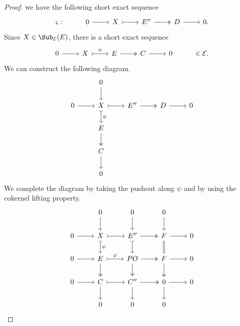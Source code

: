 \begin{proof}
we have the following short exact sequence
 \[\begin{tikzcd}
	\varsigma: & 0 & X & E'' & D&  0.
	\arrow[from=1-2, to=1-3]
	\arrow[tail, from=1-3, to=1-4]
	\arrow[two heads,from=1-4, to=1-5]
	\arrow[from=1-5, to=1-6]
\end{tikzcd}\] Since $X \in \Sub_\mathcal{E}(E)$,
there is a short exact sequence \[\begin{tikzcd}
	0 & X & E  & C &  0& \in \mathcal{E}.
	\arrow[from=1-1, to=1-2]
	\arrow[tail,"\psi", from=1-2, to=1-3]
	\arrow[,two heads,from=1-3, to=1-4]
	\arrow[from=1-4, to=1-5]
\end{tikzcd} \]
We can construct the following diagram.
\[\begin{tikzcd}
         & 0 & & &  \\
	0 & X & E''  & D &  0 \\
      & E & &  & \\
      & C & & & \\
       & 0 & & & 
	\arrow[from=2-1, to=2-2]
	\arrow[tail, from=2-2, to=2-3]
	\arrow[two heads,from=2-3, to=2-4]
	\arrow[from=2-4, to=2-5]
        \arrow[from=4-2, to=5-2]
	\arrow[two heads, from=3-2, to=4-2]
	\arrow[tail,"\psi",from=2-2, to=3-2]
	\arrow[from=1-2, to=2-2]
\end{tikzcd} \]
We complete the diagram by taking the pushout along $\psi$ and by using the cokernel lifting property. 
\[\begin{tikzcd}
         & 0 & 0 & 0 &  \\
	0 & X & E''  & F &  0 \\
     0 & E & PO & F & 0 \\
      0 & C & C'' & 0 & 0 \\
       & 0 & 0 & 0 & 
	\arrow[from=2-1, to=2-2]
	\arrow[tail, from=2-2, to=2-3]
	\arrow[two heads,from=2-3, to=2-4]
	\arrow[from=2-4, to=2-5]
        \arrow[from=3-1, to=3-2]
	\arrow[tail,"\varphi", from=3-2, to=3-3]
	\arrow[two heads,from=3-3, to=3-4]
	\arrow[from=3-4, to=3-5]
        \arrow[from=4-1, to=4-2]
	\arrow[tail, from=4-2, to=4-3]
	\arrow[two heads,from=4-3, to=4-4]
	\arrow[from=4-4, to=4-5]
        \arrow[from=4-2, to=5-2]
	\arrow[two heads, from=3-2, to=4-2]
	\arrow[tail,"\psi",from=2-2, to=3-2]
	\arrow[from=1-2, to=2-2]
        \arrow[from=4-3, to=5-3]
	\arrow[two heads, from=3-3, to=4-3]
	\arrow[tail,from=2-3, to=3-3]
	\arrow[from=1-3, to=2-3]
        \arrow[from=4-4, to=5-4]
	\arrow[two heads, from=3-4, to=4-4]
	\arrow[equals,from=2-4, to=3-4]
	\arrow[from=1-4, to=2-4]
\end{tikzcd} \]


\end{proof}
